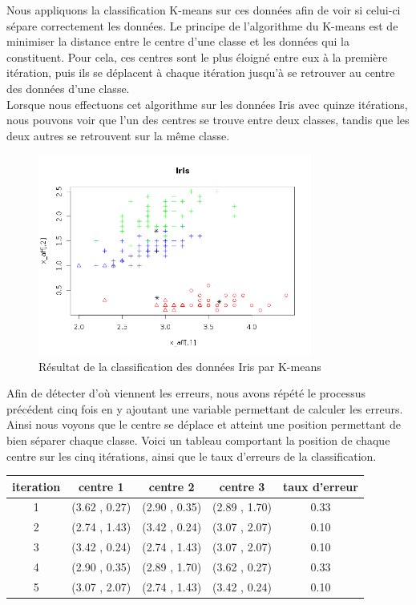 \documentclass[a4paper,11pt]{article}
\begin{document}
  Nous appliquons la classification K-means sur ces données afin de voir si celui-ci sépare correctement les données.
  Le principe de l'algorithme du K-means est de minimiser la distance entre le centre d'une classe et les données
  qui la constituent. Pour cela, ces centres sont le plus éloigné entre eux à la première itération, puis ils se 
  déplacent à chaque itération jusqu'à se retrouver au centre des données d'une classe.\\
  
  Lorsque nous effectuons cet algorithme sur les données Iris avec quinze itérations, nous pouvons voir que l'un des centres se trouve 
  entre deux classes, tandis que les deux autres se retrouvent sur la même classe.
  
  \begin{figure}[H]
    \center
    \includegraphics[width=9cm]{resultat/kmeans.png}
    \caption{Résultat de la classification des données Iris par K-means}
  \end{figure}
  
  Afin de détecter d'où viennent les erreurs, nous avons répété le processus précédent cinq fois en y ajoutant
  une variable permettant de calculer les erreurs. Ainsi nous voyons que le centre se déplace et atteint une
  position permettant de bien séparer chaque classe. Voici un tableau comportant la position de chaque centre
  sur les cinq itérations, ainsi que le taux d'erreurs de la classification.\\
  
  \begin{center}
  \begin{tabular}{|c|c|c|c|c|}
    \hline
    iteration & centre 1 & centre 2 & centre 3 & taux d'erreur\\
    \hline
    1 & (3.62 , 0.27) & (2.90 , 0.35) & (2.89 , 1.70) & 0.33\\
    \hline
    2 & (2.74 , 1.43) & (3.42 , 0.24) & (3.07 , 2.07) & 0.10\\
    \hline
    3 & (3.42 , 0.24) & (2.74 , 1.43) & (3.07 , 2.07) & 0.10\\
    \hline
    4 & (2.90 , 0.35) & (2.89 , 1.70) & (3.62 , 0.27) & 0.33\\
    \hline
    5 & (3.07 , 2.07) & (2.74 , 1.43) & (3.42 , 0.24) & 0.10\\
    \hline
  \end{tabular}
  \end{center}
  
\end{document}
